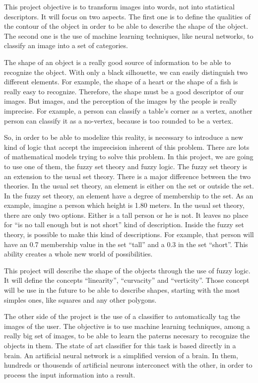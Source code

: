 This project objective is to transform images into words, not into statistical descriptors. It will focus on two aspects. The first one is to define the qualities of the contour of the object in order to be able to describe the shape of the object. The second one is the use of machine learning techniques, like neural networks, to classify an image into a set of categories.

The shape of an object is a really good source of information to be able to recognize the object. With only a black silhouette, we can easily distinguish two different elements. For example, the shape of a heart or the shape of a fish is really easy to recognize. Therefore, the shape must be a good descriptor of our images. But images, and the perception of the images by the people is really imprecise. For example, a person can classify a table’s corner as a vertex, another person can classify it as a no-vertex, because is too rounded to be a vertex.

So, in order to be able to modelize this reality, is necessary to introduce a new kind of logic that accept the imprecision inherent of this problem. There are lots of mathematical models trying to solve this problem. In this project, we are going to use one of them, the fuzzy set theory and fuzzy logic. The fuzzy set theory is an extension to the usual set theory. There is a major difference between the two theories. In the usual set theory, an element is either on the set or outside the set. In the fuzzy set theory, an element have a degree of membership to the set. As an example, imagine a person which height is 1.80 meters. In the usual set theory, there are only two options. Either is a tall person or he is not. It leaves no place for “is no tall enough but is not short” kind of description. Inside the fuzzy set theory, is possible to make this kind of descriptions. For example, that person will have an 0.7 membership value in the set “tall” and a 0.3 in the set “short”. This ability creates a whole new world of possibilities.

This project will describe the shape of the objects through the use of fuzzy logic. It will define the concepts “linearity”, “curvacity” and “verticity”. Those concept will be use in the future to be able to describe shapes, starting with the most simples ones, like squares and any other polygons.

The other side of the project is the use of a classifier to automatically tag the images of the user. The objective is to use machine learning techniques, among a really big set of images, to be able to learn the paterns necesary to recognize the objects in them. The state of art classifier for this task is based directly in a brain. An artificial neural network is a simplified version of a brain. In them, hundreds or thousends of artificial neurons interconect with the other, in order to process the input information into a result.

